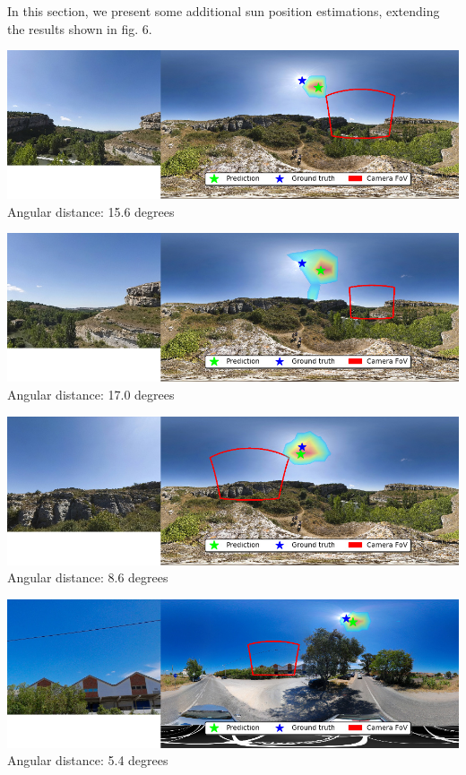 In this section, we present some additional sun position estimations,
extending the results shown in fig. 6.


\def\mywidth{0.9\linewidth}

\begin{multicols}{2}

\includegraphics[width=\mywidth]{pano_aacuaoohjiliba_002.jpg}\\
Angular distance: 15.6 degrees

\includegraphics[width=\mywidth]{pano_aacuaoohjiliba_006.jpg}\\
Angular distance: 17.0 degrees

\includegraphics[width=\mywidth]{pano_aacuaoohjiliba_005.jpg}\\
Angular distance: 8.6 degrees

\includegraphics[width=\mywidth]{pano_aaezuadrpeomdf.jpg}\\
Angular distance: 5.4 degrees


\end{multicols}
